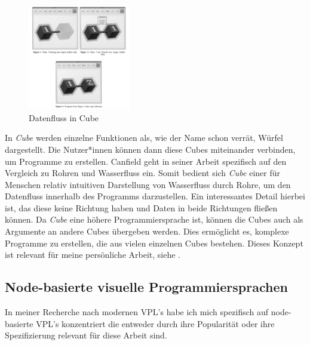 \documentclass[ngerman]{article}
\begin{document}
\begingroup
\setlength\intextsep{2pt}

\begin{minipage}{\linewidth}
\begin{figure}
  \centering
  \includegraphics[width=0.4\textwidth]{./graphics/cube_vpl.png} %
  \caption{Datenfluss in Cube \cite{najork1996programming}}
  \label{fig:cube_demo}
\end{figure}
    \cite{najork1996programming}
In \textit{Cube} werden einzelne Funktionen als, wie der Name schon verrät, Würfel dargestellt. Die Nutzer*innen können dann diese Cubes miteinander verbinden, um Programme zu erstellen.
Canfield geht in seiner Arbeit spezifisch auf den Vergleich zu Rohren und Wasserfluss ein. Somit bedient sich \textit{Cube} einer für Menschen relativ intuitiven Darstellung von Wasserfluss durch Rohre, um den Datenfluss innerhalb des Programms darzustellen.
  Ein interessantes Detail hierbei ist, das diese  keine Richtung haben und Daten in beide Richtungen fließen können. 
Da \textit{Cube} eine höhere Programmiersprache ist, können die Cubes auch als Argumente an andere Cubes übergeben werden. Dies ermöglicht es, komplexe Programme zu erstellen, die aus vielen einzelnen Cubes bestehen. 
\linebreak
\linebreak
Dieses Konzept ist relevant für meine persönliche Arbeit, siehe .

\end{minipage}
\endgroup
\pagebreak

\subsection{Node-basierte visuelle Programmiersprachen}
In meiner Recherche nach modernen VPL's habe ich mich spezifisch auf node-basierte VPL's konzentriert die entweder durch ihre Popularität oder ihre Spezifizierung relevant für diese Arbeit sind.
\end{document}
